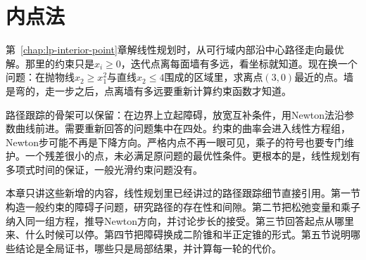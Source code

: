 \chapter{内点法}
\label{chap:nonlinear-interior-point}

第~\ref{chap:lp-interior-point}章解线性规划时，从可行域内部沿中心路径走向最优解。那里的约束只是$x_i\geq0$，迭代点离每面墙有多远，看坐标就知道。现在换一个问题：在抛物线$x_2\geq x_1^2$与直线$x_2\leq4$围成的区域里，求离点$(3,0)$最近的点。墙是弯的，走一步之后，点离墙有多远要重新计算约束函数才知道。

路径跟踪的骨架可以保留：在边界上立起障碍，放宽互补条件，用Newton法沿参数曲线前进。需要重新回答的问题集中在四处。约束的曲率会进入线性方程组，Newton步可能不再是下降方向。严格内点不再一眼可见，乘子的符号也要专门维护。一个残差很小的点，未必满足原问题的最优性条件。更根本的是，线性规划有多项式时间的保证，一般光滑约束问题没有。

本章只讲这些新增的内容，线性规划里已经讲过的路径跟踪细节直接引用。第一节构造一般约束的障碍子问题，研究路径的存在性和间隙。第二节把松弛变量和乘子纳入同一组方程，推导Newton方向，并讨论步长的接受。第三节回答起点从哪里来、什么时候可以停。第四节把障碍换成二阶锥和半正定锥的形式。第五节说明哪些结论是全局证书，哪些只是局部结果，并计算每一轮的代价。







